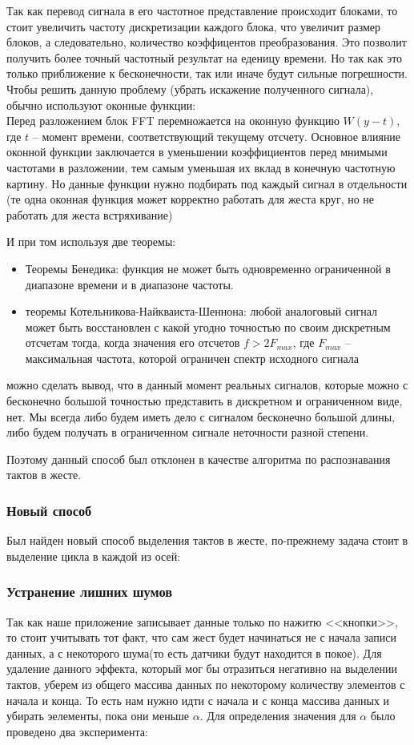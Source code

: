 Так как перевод сигнала в его частотное представление происходит блоками, то стоит увеличить частоту дискретизации каждого блока, что увеличит размер блоков, а следовательно, количество коэффицентов преобразования. Это позволит получить более точный частотный результат на еденицу времени. Но так как это только приближение к бесконечности, так или иначе будут сильные погрешности. \\

Чтобы решить данную проблему (убрать искажение полученного сигнала), обычно используют оконные функции: \\
Перед разложением блок FFT перемножается на оконную функцию $W(y - t)$, где $t$ -- момент времени, соответствующий текущему отсчету. Основное влияние оконной функции заключается в уменьшении коэффициентов перед мнимыми частотами в разложении, тем самым уменьшая их вклад в конечную частотную картину. Но данные функции нужно подбирать под каждый сигнал в отдельности (те одна оконная функция может корректно работать для жеста круг, но не работать для жеста встряхивание)

И при том используя две теоремы:
\begin{itemize}
    \item Теоремы Бенедика: функция не может быть одновременно ограниченной в диапазоне времени и в диапазоне частоты.
    \item теоремы Котельникова-Найкваиста-Шеннона: любой аналоговый сигнал может быть восстановлен с какой угодно точностью по своим дискретным отсчетам тогда, когда значения его отсчетов $f > 2 F_{max}$, где $F_{max}$ -- максимальная частота, которой ограничен спектр исходного сигнала
\end{itemize}
можно сделать вывод, что в данный момент реальных сигналов, которые можно с бесконечно большой точностью представить в дискретном и ограниченном виде, нет. Мы всегда либо будем иметь дело с сигналом бесконечно большой длины, либо будем получать в ограниченном сигнале неточности разной степени.

Поэтому данный способ был отклонен в качестве алгоритма по распознавания тактов в жесте.

\subsubsection{Новый способ}
Был найден новый способ выделения тактов в жесте, по-прежнему задача стоит в выделение цикла в каждой из осей:
\subsubsection{Устранение лишних шумов}
Так как наше приложение записывает данные только по нажитю <<кнопки>>, то стоит учитывать тот факт, что сам жест будет начинаться не с начала записи данных, а с некоторого шума(то есть датчики будут находится в покое). Для удаление данного эффекта, который мог бы отразиться негативно на выделении тактов, уберем из общего массива данных по некоторому количеству элементов с начала и конца. То есть нам нужно идти с начала и с конца массива данных и убирать эелементы, пока они меньше $\alpha$. Для определения значения для $\alpha$ было проведено два эксперимента:

